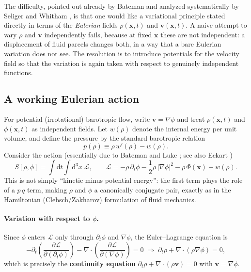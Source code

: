 \documentclass[11pt]{article}
\newcommand{\rd}{\mathrm{d}}
\newcommand{\bv}{\mathbf{v}}
\newcommand{\bx}{\mathbf{x}}
\begin{document}
The difficulty, pointed out already by Bateman \cite{Bateman1929} and analyzed systematically by Seliger and Whitham \cite{SeligerWhitham1968}, is that one would like a variational principle stated directly in terms of the \emph{Eulerian} fields $\rho(\bx,t)$ and $\bv(\bx,t)$. A naive attempt to vary $\rho$ and $\bv$ independently fails, because at fixed $\bx$ these are not independent: a displacement of fluid parcels changes both, in a way that a bare Eulerian variation does not see. The resolution is to introduce potentials for the velocity field so that the variation is again taken with respect to genuinely independent functions.

\subsection{A working Eulerian action}

For potential (irrotational) barotropic flow, write $\bv = \nabla\phi$ and treat $\rho(\bx,t)$ and $\phi(\bx,t)$ as independent fields. Let $w(\rho)$ denote the internal energy per unit volume, and define the pressure by the standard barotropic relation
\begin{equation}
p(\rho) \equiv \rho\, w'(\rho) - w(\rho). \label{eq:pressure-def}
\end{equation}
Consider the action (essentially due to Bateman \cite{Bateman1929} and Luke \cite{Luke1967}; see also Eckart \cite{Eckart1960})
\begin{equation}
S[\rho,\phi] = \int \rd t \int \rd^3x \; \mathcal{L}, \qquad
\mathcal{L} = -\rho\,\partial_t\phi - \frac12\rho\,|\nabla\phi|^2 - \rho\,\Phi(\bx) - w(\rho). \label{eq:hydro-action}
\end{equation}
This is not simply ``kinetic minus potential energy'': the first term plays the role of a $p\,\dot q$ term, making $\rho$ and $\phi$ a canonically conjugate pair, exactly as in the Hamiltonian (Clebsch/Zakharov) formulation of fluid mechanics.

\paragraph{Variation with respect to $\phi$.} Since $\phi$ enters $\mathcal L$ only through $\partial_t\phi$ and $\nabla\phi$, the Euler--Lagrange equation is
\begin{equation}
-\partial_t\left(\frac{\partial\mathcal L}{\partial(\partial_t\phi)}\right) - \nabla\cdot\left(\frac{\partial \mathcal L}{\partial(\nabla\phi)}\right) = 0
\;\Longrightarrow\;
\partial_t\rho + \nabla\cdot(\rho\nabla\phi) = 0,
\end{equation}
which is precisely the \textbf{continuity equation} $\partial_t\rho + \nabla\cdot(\rho\bv)=0$ with $\bv=\nabla\phi$.
\end{document}
